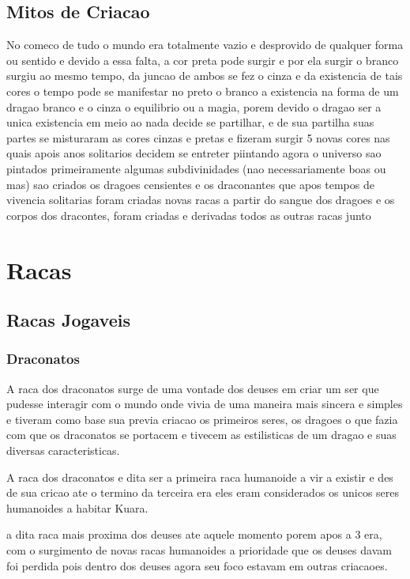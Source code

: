 \documentclass{book}
\begin{document}
\chapter{Mitos de Criacao}
No comeco de tudo o mundo era totalmente vazio e desprovido de qualquer forma ou sentido e 
devido a essa falta, a cor preta pode surgir e por ela surgir o branco surgiu ao mesmo tempo, 
da juncao de ambos se fez o cinza e da existencia de tais cores o tempo pode se manifestar no 
preto o branco a existencia na forma de um dragao branco e o cinza o equilibrio ou a magia, 
porem devido o dragao ser a unica existencia em meio ao nada decide se partilhar, e de sua 
partilha suas partes se misturaram as cores cinzas e pretas e fizeram surgir 5 novas cores nas 
quais apois anos solitarios decidem se entreter piintando agora o universo sao pintados 
primeiramente algumas subdivinidades (nao necessariamente boas ou mas) sao criados os dragoes 
censientes e os draconantes que apos tempos de vivencia solitarias foram criadas novas racas a 
partir do sangue dos dragoes e os corpos dos dracontes, foram criadas e derivadas todos as 
outras racas junto 

\part{Racas}
\chapter{Racas Jogaveis}
\section{Draconatos}
A raca dos draconatos surge de uma vontade dos deuses em criar um ser que pudesse interagir 
com o mundo onde vivia de uma maneira mais sincera e simples e tiveram como base sua previa 
criacao os primeiros seres, os dragoes o que fazia com que os draconatos se portacem e
tivecem as estilisticas de um dragao e suas diversas caracteristicas.

A raca dos draconatos e dita ser a primeira raca humanoide a vir a existir e des de sua cricao 
ate o termino da terceira era eles eram considerados os unicos seres humanoides a habitar 
Kuara.

a dita raca mais proxima dos deuses ate aquele momento porem apos  a 3 era, com o surgimento
de novas racas humanoides a prioridade que os deuses davam 
foi perdida pois dentro dos deuses agora seu foco estavam em outras criacaoes.
\end{document}
